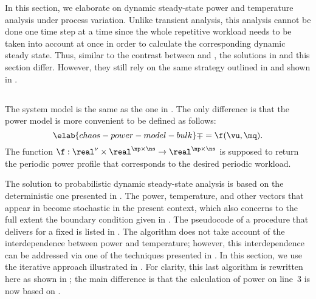 In this section, we elaborate on dynamic steady-state power and temperature
analysis under process variation. Unlike transient analysis, this analysis
cannot be done one time step at a time since the whole repetitive workload needs
to be taken into account at once in order to calculate the corresponding dynamic
steady state. Thus, similar to the contrast between 
and , the solutions in
 and this section differ. However, they still
rely on the same strategy outlined in  and
shown in .

\subsection{\problemtitle}

The system model is the same as the one in . The
only difference is that the power model is more convenient to be defined as
follows:
\begin{equation} \elab{chaos-power-model-bulk}
  \mp = \f(\vu, \mq).
\end{equation}
The function $\f: \real^\nu \times \real^{\np \times \ns} \to \real^{\np \times
\ns}$ is supposed to return the periodic power profile that corresponds to the
desired periodic workload.

The solution to probabilistic dynamic steady-state analysis is based on the
deterministic one presented in . The power,
temperature, and other vectors that appear in
 become stochastic in the present context,
which also concerns to the full extent the boundary condition given in
. The pseudocode of a procedure that
delivers \mq for a fixed \vu is listed in .
The algorithm does not take account of the interdependence between power and
temperature; however, this interdependence can be addressed via one of the
techniques presented in . In this section, we
use the iterative approach illustrated in
. For clarity, this last algorithm
is rewritten here as shown in ;
the main difference is that the calculation of power on line~3 is now based on
.

